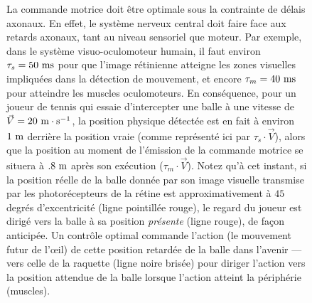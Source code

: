 \begin{figure}
{La commande motrice doit être optimale sous la contrainte de délais axonaux. En effet, le système nerveux central doit faire face aux retards axonaux, tant au niveau sensoriel que moteur. Par exemple, dans le système visuo-oculomoteur humain, il faut environ $\tau_s = 50 ~\si{\milli\second} $ pour que l'image rétinienne atteigne les zones visuelles impliquées dans la détection de mouvement, et encore $\tau_m = 40 ~\si{\milli\second} $ pour atteindre les muscles oculomoteurs. En conséquence, pour un joueur de tennis qui essaie d'intercepter une balle  à une vitesse de $ \vec {V} = 20 ~\si{\meter}\cdot\si{\second} ^ {- 1} $, la position physique détectée est en fait à environ $ 1 ~\si{\meter} $ derrière la position vraie (comme représenté ici par $\tau_s\cdot\vec {V} $), alors que la position au moment de l'émission de la commande motrice se situera à $.8 ~\si{\meter} $ après son exécution ($\tau_m\cdot\vec {V} $). Notez qu'à cet instant, si la position réelle de la balle donnée par son image visuelle transmise par les photorécepteurs de la rétine  est approximativement à $ 45 $ degrés d'excentricité (ligne pointillée rouge), le regard du joueur est dirigé vers la balle à sa position \emph{présente} (ligne rouge), de façon anticipée. Un contrôle optimal commande l'action (le mouvement futur de l'\oe il) de cette position retardée de la balle dans l'avenir --- vers celle de la raquette (ligne noire brisée) pour diriger l'action vers la position attendue de la balle lorsque l'action atteint la périphérie (muscles).
}%
\label{fig:figure0}
\end{figure}

